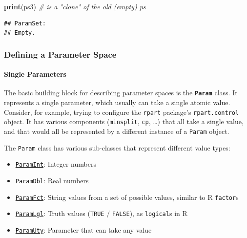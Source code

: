 \documentclass[]{article}
\newenvironment{Shaded}{\begin{snugshade}}{\end{snugshade}}
\newcommand{\CommentTok}[1]{\textcolor[rgb]{0.56,0.35,0.01}{\textit{#1}}}
\newcommand{\KeywordTok}[1]{\textcolor[rgb]{0.13,0.29,0.53}{\textbf{#1}}}
\newcommand{\NormalTok}[1]{#1}
\providecommand{\tightlist}{%
  \setlength{\itemsep}{0pt}\setlength{\parskip}{0pt}}
\let\oldparagraph\paragraph
\renewcommand{\paragraph}[1]{\oldparagraph{#1}\mbox{}}
\renewenvironment{Shaded} {\begin{snugshade}\small} {\end{snugshade}}
\begin{document}
\begin{Shaded}
\begin{Highlighting}[]
\KeywordTok{print}\NormalTok{(ps3) }\CommentTok{# is a "clone" of the old (empty) ps}
\end{Highlighting}
\end{Shaded}

\begin{verbatim}
## ParamSet: 
## Empty.
\end{verbatim}

\hypertarget{defining-a-parameter-space}{%
\subsubsection{Defining a Parameter Space}\label{defining-a-parameter-space}}

\hypertarget{single-parameters}{%
\paragraph{Single Parameters}\label{single-parameters}}

The basic building block for describing parameter spaces is the \textbf{\texttt{Param}} class.
It represents a single parameter, which usually can take a single atomic value.
Consider, for example, trying to configure the \texttt{rpart} package's \texttt{rpart.control} object.
It has various components (\texttt{minsplit}, \texttt{cp}, \ldots{}) that all take a single value, and that would all be represented by a different instance of a \texttt{Param} object.

The \texttt{Param} class has various sub-classes that represent different value types:

\begin{itemize}
\tightlist
\item
  \href{https://paradox.mlr-org.com/reference/ParamInt.html}{\texttt{ParamInt}}: Integer numbers
\item
  \href{https://paradox.mlr-org.com/reference/ParamDbl.html}{\texttt{ParamDbl}}: Real numbers
\item
  \href{https://paradox.mlr-org.com/reference/ParamFct.html}{\texttt{ParamFct}}: String values from a set of possible values, similar to R \texttt{factor}s
\item
  \href{https://paradox.mlr-org.com/reference/ParamLgl.html}{\texttt{ParamLgl}}: Truth values (\texttt{TRUE} / \texttt{FALSE}), as \texttt{logical}s in R
\item
  \href{https://paradox.mlr-org.com/reference/ParamUty.html}{\texttt{ParamUty}}: Parameter that can take any value
\end{itemize}
\end{document}
